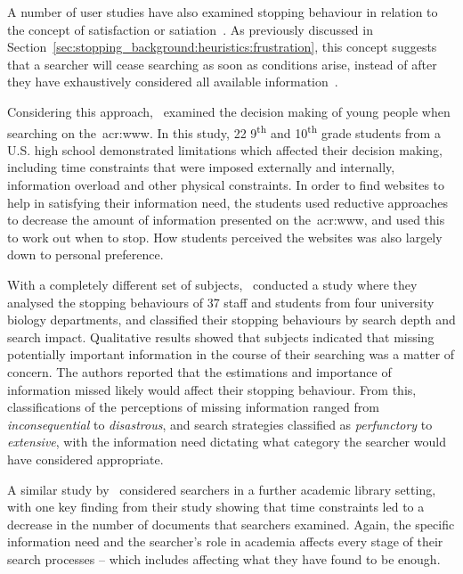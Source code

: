 A number of user studies have also examined stopping behaviour in relation to the concept of satisfaction or satiation~\citep{simon1955satiation}. As previously discussed in Section~\ref{sec:stopping_background:heuristics:frustration}, this concept suggests that a searcher will cease searching as soon as conditions arise, instead of after they have exhaustively considered all available information~\citep{march1994primer}.

Considering this approach,~\cite{agosto2002satisficing} examined the decision making of young people when searching on the~\gls{acr:www}. In this study, 22 9\textsuperscript{th} and 10\textsuperscript{th} grade students from a U.S. high school demonstrated limitations which affected their decision making, including time constraints that were imposed externally and internally, information overload and other physical constraints. In order to find websites to help in satisfying their information need, the students used reductive approaches to decrease the amount of information presented on the~\gls{acr:www}, and used this to work out when to stop. How students perceived the websites was also largely down to personal preference.

With a completely different set of subjects,~\cite{mansourian2007search} conducted a study where they analysed the stopping behaviours of 37 staff and students from four university biology departments, and classified their stopping behaviours by search depth and search impact. Qualitative results showed that subjects indicated that missing potentially important information in the course of their searching was a matter of concern. The authors reported that the estimations and importance of information missed likely would affect their stopping behaviour. From this, classifications of the perceptions of missing information ranged from \emph{inconsequential} to \emph{disastrous}, and search strategies classified as \emph{perfunctory} to \emph{extensive}, with the information need dictating what category the searcher would have considered appropriate.

A similar study by~\cite{prabha2007enough} considered searchers in a further academic library setting, with one key finding from their study showing that time constraints led to a decrease in the number of documents that searchers examined. Again, the specific information need and the searcher's role in academia affects every stage of their search processes -- which includes affecting what they have found to be enough.

